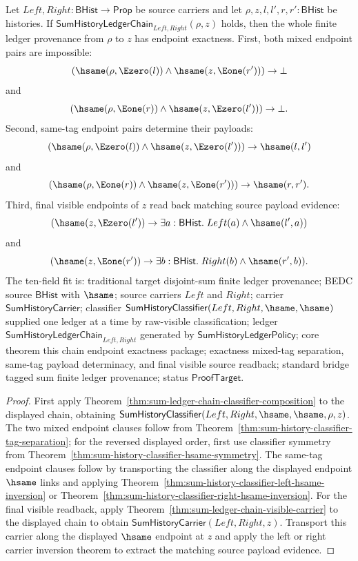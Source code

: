 \begin{theorem}
\label{thm:sum-ledger-chain-endpoint-exactness}
Let $Left,Right:\mathsf{BHist}\to\mathsf{Prop}$ be source carriers and let
$\rho,z,l,l',r,r':\mathsf{BHist}$ be histories. If
$\mathsf{SumHistoryLedgerChain}_{Left,Right}(\rho,z)$ holds, then the whole
finite ledger provenance from $\rho$ to $z$ has endpoint exactness. First, both
mixed endpoint pairs are impossible:
$$
(\hsame(\rho,\Ezero(l))\land\hsame(z,\Eone(r')))\to\bot
$$
and
$$
(\hsame(\rho,\Eone(r))\land\hsame(z,\Ezero(l')))\to\bot.
$$
Second, same-tag endpoint pairs determine their payloads:
$$
(\hsame(\rho,\Ezero(l))\land\hsame(z,\Ezero(l')))\to\hsame(l,l')
$$
and
$$
(\hsame(\rho,\Eone(r))\land\hsame(z,\Eone(r')))\to\hsame(r,r').
$$
Third, final visible endpoints of $z$ read back matching source payload
evidence:
$$
(\hsame(z,\Ezero(l'))\to\exists a:\mathsf{BHist}.\;Left(a)\land\hsame(l',a))
$$
and
$$
(\hsame(z,\Eone(r'))\to\exists b:\mathsf{BHist}.\;Right(b)\land\hsame(r',b)).
$$
The ten-field fit is: traditional target disjoint-sum finite ledger provenance;
BEDC source $\mathsf{BHist}$ with $\hsame$; source carriers $Left$ and $Right$;
carrier $\mathsf{SumHistoryCarrier}$; classifier
$\mathsf{SumHistoryClassifier}(Left,Right,\hsame,\hsame)$ supplied one ledger at
a time by raw-visible classification; ledger
$\mathsf{SumHistoryLedgerChain}_{Left,Right}$ generated by
$\mathsf{SumHistoryLedgerPolicy}$; core theorem this chain endpoint exactness
package; exactness mixed-tag separation, same-tag payload determinacy, and final
visible source readback; standard bridge tagged sum finite ledger provenance;
status $\mathsf{ProofTarget}$.
\end{theorem}
\begin{proof}
First apply Theorem~\ref{thm:sum-ledger-chain-classifier-composition} to the
displayed chain, obtaining
$\mathsf{SumHistoryClassifier}(Left,Right,\hsame,\hsame,\rho,z)$. The two mixed
endpoint clauses follow from
Theorem~\ref{thm:sum-history-classifier-tag-separation}; for the reversed
displayed order, first use classifier symmetry from
Theorem~\ref{thm:sum-history-classifier-hsame-symmetry}. The same-tag endpoint
clauses follow by transporting the classifier along the displayed endpoint
$\hsame$ links and applying
Theorem~\ref{thm:sum-history-classifier-left-hsame-inversion} or
Theorem~\ref{thm:sum-history-classifier-right-hsame-inversion}. For the final
visible readback, apply
Theorem~\ref{thm:sum-ledger-chain-visible-carrier} to the displayed chain to
obtain $\mathsf{SumHistoryCarrier}(Left,Right,z)$. Transport this carrier along
the displayed $\hsame$ endpoint at $z$ and apply the left or right carrier
inversion theorem to extract the matching source payload evidence.
\end{proof}

